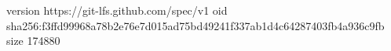 version https://git-lfs.github.com/spec/v1
oid sha256:f3ffd99968a78b2e76e7d015ad75bd49241f337ab1d4c64287403fb4a936c9fb
size 174880
